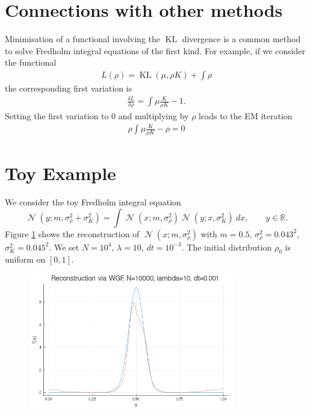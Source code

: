 \documentclass[a4paper]{article}
\theoremstyle{definition}
\DeclareMathOperator{\N}{\mathcal{N}}
\DeclareMathOperator{\KL}{KL}
\begin{document}
\section{Connections with other methods}
Minimisation of a functional involving the $\KL$ divergence is a common method to solve Fredholm integral equations of the first kind.
For example, if we consider the functional
\begin{align*}
L(\rho) = \KL(\mu, \rho K) + \int \rho
\end{align*}
the corresponding first variation is
\begin{align*}
\frac{\delta L}{\delta \rho}= \int \mu\frac{K}{\rho K} - 1.
\end{align*}
Setting the first variation to 0 and multiplying by $\rho$ leads to the EM iteration
\begin{align*}
\rho\int \mu\frac{K}{\rho K} - \rho = 0
\end{align*}
\section{Toy Example}

We consider the toy Fredholm integral equation
\begin{equation*}
\N(y; m, \sigma_{\rho}^2 + \sigma_K^2) = \int \N(x; m, \sigma_{\rho}^2)\N(y; x, \sigma_K^2)\ dx,\qquad y\in\mathbb{R}.
\end{equation*}
Figure \ref{fig:at} shows the reconstruction of $\N(x; m, \sigma_{\rho}^2)$ with $m=0.5$, $\sigma_{\rho}^2 = 0.043^2$, $\sigma_K^2 = 0.045^2$.
We set $N=10^{4}$, $\lambda = 10$, $dt = 10^{-3}$. The initial distribution $\rho_0$ is uniform on $[0, 1]$.

\begin{figure}
\centering
\includegraphics[width = 0.8\textwidth]{analitically_tractable}
\caption{ }
\label{fig:at}
\end{figure}
\end{document}
